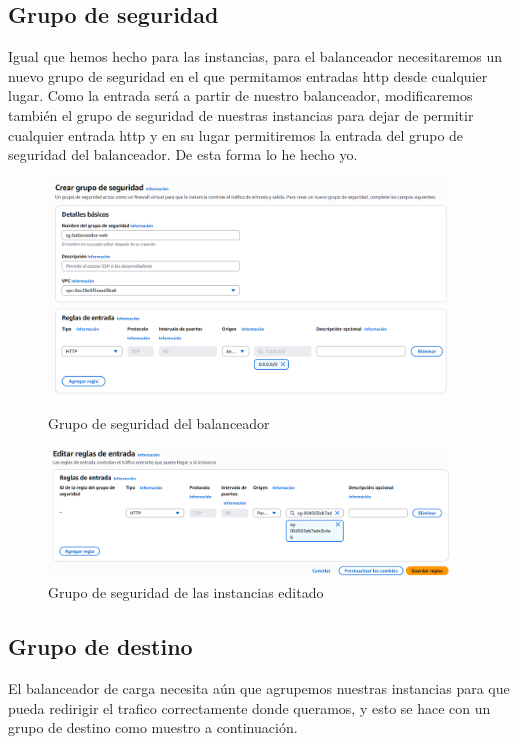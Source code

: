 \documentclass{article}
\begin{document}
\subsection{Grupo de seguridad}

	Igual que hemos hecho para las instancias, para el balanceador necesitaremos un nuevo grupo de seguridad en el que permitamos entradas http desde cualquier lugar. Como la entrada será a partir de nuestro balanceador, modificaremos también el grupo de seguridad de nuestras instancias para dejar de permitir cualquier entrada http y en su lugar permitiremos la entrada del grupo de seguridad del balanceador. De esta forma lo he hecho yo.

	\begin{figure}[H]
	\centering
	\includegraphics[width=0.95\textwidth]{grupo_de_seguridad_balanceador.png}
	\caption{Grupo de seguridad del balanceador}
	\includegraphics[width=0.95\textwidth]{editar_reglas_grupo_seguridad.png}
	\caption{Grupo de seguridad de las instancias editado}
	\end{figure}

\subsection{Grupo de destino}

	El balanceador de carga necesita aún que agrupemos nuestras instancias para que pueda redirigir el trafico correctamente donde queramos, y esto se hace con un grupo de destino como muestro a continuación.
\end{document}
